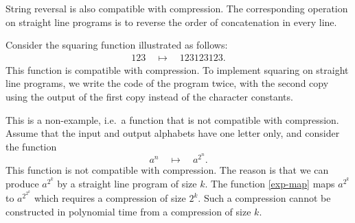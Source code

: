 \documentclass{article}
\begin{document}
\begin{myexample}[Reversal]\label{ex:reversal}
    String reversal is also compatible with compression. The corresponding operation on straight line programs is to reverse the order of concatenation in every line. 
\end{myexample}

\begin{myexample}[Squaring]\label{ex:squaring}
  Consider the squaring function illustrated as follows:
\begin{align*}
    123 \quad \mapsto \quad 123123123.
\end{align*}
This function  is compatible with compression. To implement squaring on  straight line programs, we write the code of the program twice, with the second copy using the output of the first copy instead of the character constants. 
\end{myexample}

\begin{myexample} \label{ex:exp-output} This is a non-example, i.e.~a function that is not compatible with compression.
    Assume that the input and output alphabets have one letter only, and consider the function 
    \begin{equation} \label{exp-map}
    a^n \quad \mapsto \quad a^{2^n}.
    \end{equation}
    This function is not compatible with compression. The reason is that we can produce $a^{2^k}$ by a straight line program of size $k$.
    The  function \eqref{exp-map} maps $a^{2^k}$ to $a^{2^{2^k}}$ which requires a compression of size $2^k$. 
    Such a compression cannot be constructed in polynomial time from a compression of size $k$.
\end{myexample}
\end{document}
